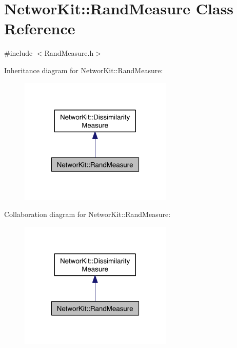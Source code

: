 \hypertarget{class_networ_kit_1_1_rand_measure}{\section{Networ\-Kit\-:\-:Rand\-Measure Class Reference}
\label{class_networ_kit_1_1_rand_measure}
}


{\ttfamily \#include $<$Rand\-Measure.\-h$>$}



Inheritance diagram for Networ\-Kit\-:\-:Rand\-Measure\-:\nopagebreak
\begin{figure}[H]
\begin{center}
\leavevmode
\includegraphics[width=206pt]{class_networ_kit_1_1_rand_measure__inherit__graph}
\end{center}
\end{figure}


Collaboration diagram for Networ\-Kit\-:\-:Rand\-Measure\-:\nopagebreak
\begin{figure}[H]
\begin{center}
\leavevmode
\includegraphics[width=206pt]{class_networ_kit_1_1_rand_measure__coll__graph}
\end{center}
\end{figure}
